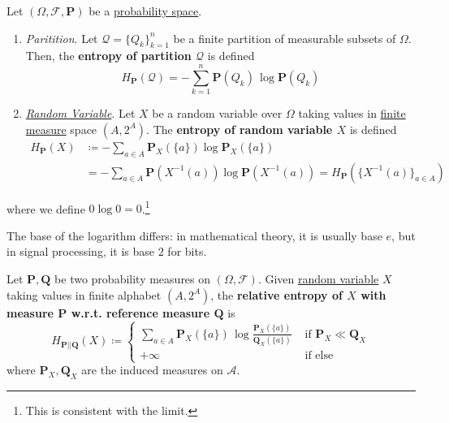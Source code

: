   \begin{definition}
    \label{def:entropy-in-discrete-setting}
 
    Let $(\Omega, \mathcal{F}, \mathbf{P})$ be a \hyperref[prob-def:probability-space]{probability space}.  

    \begin{enumerate}
      \item \textit{Paritition}. Let $\mathcal{Q} = \{Q_k\}_{k=1}^n$ be a finite partition of measurable subsets of $\Omega$. Then, the \textbf{entropy of partition $\mathcal{Q}$} is defined 
        \begin{equation}
          H_{\mathbf{P}} (\mathcal{Q}) = - \sum_{k=1}^n \mathbf{P}(Q_k) \, \log{\mathbf{P}(Q_k)}
        \end{equation}

      \item \textit{\hyperref[prob-def:random-variable]{Random Variable}}. Let $X$ be a random variable over $\Omega$ taking values in \hyperref[mt-def:finite-measure]{finite measure} space $(A, 2^A)$. The \textbf{entropy of random variable $X$} is defined 
        \begin{align} 
          H_{\mathbf{P}} (X) & \coloneqq -\sum_{a \in A} \mathbf{P}_X (\{a\}) \log{\mathbf{P}_X (\{a\})} \\ 
                             & = -\sum_{a \in A} \mathbf{P}(X^{-1}(a)) \log{\mathbf{P}(X^{-1}(a))} = H_{\mathbf{P}}(\{X^{-1}(a)\}_{a \in A})
        \end{align}
    \end{enumerate}
    where we define $0 \log{0} = 0$.\footnote{This is consistent with the limit. } 
  \end{definition} 

  The base of the logarithm differs: in mathematical theory, it is usually base $e$, but in signal processing, it is base $2$ for bits. 

  \begin{definition}
    \label{def:relative-entropy-in-discrete-setting}
    Let $\mathbf{P}, \mathbf{Q}$ be two probability measures on $(\Omega, \mathcal{F})$. Given \hyperref[prob-def:random-variable]{random variable} $X$ taking values in finite alphabet $(A, 2^A)$, the \textbf{relative entropy of $X$ with measure $\mathbf{P}$ w.r.t. reference measure $\mathbf{Q}$} is 
    \begin{equation}
      H_{\mathbf{P} || \mathbf{Q}} (X) \coloneqq \begin{cases} 
        \sum_{a \in A} \mathbf{P}_X (\{a\}) \, \log \frac{\mathbf{P}_X (\{a\})}{\mathbf{Q}_X (\{a\})} & \text{ if } \mathbf{P}_{X} \ll \mathbf{Q}_{X} \\ 
        +\infty & \text{ if else }
      \end{cases}
    \end{equation}
    where $\mathbf{P}_{X}, \mathbf{Q}_{X}$ are the induced measures on $\mathcal{A}$. 
  \end{definition} 


